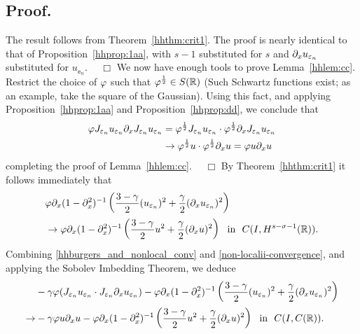 \subsection{Proof.} The result follows from Theorem~\ref{hhthm:crit1}.
The proof is nearly identical to that of
Proposition~\ref{hhprop:1aa}, with $s-1$ substituted for $s$
and $\partial_x u_{\varepsilon_n}$ substituted for $u_{\ee_n}$. $\quad \Box$
%
%
We now have enough tools to prove Lemma~\ref{hhlem:cc}. Restrict the
choice of $\varphi$ such that $\varphi^\frac{1}{2} \in S(\mathbb{R})$
(Such Schwartz functions exist; as an example, take the square
of the Gaussian). Using this fact, and applying Proposition~\ref{hhprop:1aa} and Proposition~\ref{hhprop:dd}, we conclude that
\begin{equation*}
\begin{split}
\varphi J_{\varepsilon_n} u_{\varepsilon_n} \partial_x J_{\varepsilon_n} u_{\varepsilon_n} 
& = \varphi^\frac{1}{2} J_{\varepsilon_n} u_{\varepsilon_n} \cdot
\varphi^\frac{1}{2} \partial_x J_{\varepsilon_n} u_{\varepsilon_n}
\\
& \to \varphi^\frac{1}{2} u \cdot \varphi^\frac{1}{2} \partial_x u = \varphi
u \partial_x u
\end{split}
\end{equation*}
completing the proof of Lemma~\ref{hhlem:cc}. $\quad \Box$
%
%
%
%
By Theorem~\ref{hhthm:crit1} it follows immediately that
\begin{equation}
\begin{split}
& \varphi \partial_x(1- \partial_x^2)^{-1} \left( \frac{3-\gamma}{2}
(u_{\varepsilon_n})^2
+ \frac{\gamma}{2} (\partial_x u_{\varepsilon_n})^2 \right )
\\
& \to
\varphi \partial_x(1- \partial_x^2)^{-1} \left( \frac{3-\gamma}{2} u^2
+ \frac{\gamma}{2} (\partial_x u)^2 \right ) \ \
\text{in} \ \ C(I, H^{s-\sigma-1}(\mathbb{R})).
\label{non-localii-convergence}
\end{split}
\end{equation}
Combining \eqref{hhburgers_and_nonlocal_conv} and
\eqref{non-localii-convergence}, and applying the Sobolev Imbedding
Theorem, we deduce 
\begin{equation}
\begin{split}
& -\gamma \varphi (J_{\varepsilon_n} u_{\varepsilon_n} \cdot J_{\varepsilon_n} \partial_x
u_{\varepsilon_n}) -
\varphi \partial_x(1- \partial_x^2)^{-1} \left( \frac{3-\gamma}{2}
(u_{\varepsilon_n})^2
+ \frac{\gamma}{2} (\partial_x u_{\varepsilon_n})^2 \right )
\\
\to & -\gamma \varphi u \partial_x u -
\varphi \partial_x(1- \partial_x^2)^{-1} \left( \frac{3-\gamma}{2} u^2
+ \frac{\gamma}{2} (\partial_x u)^2 \right ) \ \
\text{in} \ \ C(I, C(\mathbb{R})).
\label{llloc-non-loc-tog}
\end{split}
\end{equation}

